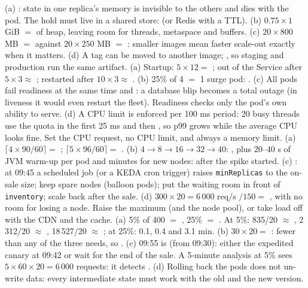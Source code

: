  (a) : state in one replica's memory is invisible to the others and dies with the pod. The hold must live in a shared store:  (or Redis with a TTL). (b) $0.75 \times 1$ GiB $=$  of heap, leaving room for threads, metaspace and buffers. (c) $20 \times 800$ MB $=$  against $20 \times 250$ MB $=$ : smaller images mean faster scale-out exactly when it matters. (d) A tag can be moved to another image; , so staging and production run the same artifact.
 (a) Startup: $5 \times 12 =$ ; out of the Service after $5 \times 3 \approx$ ; restarted after $10 \times 3 \approx$ . (b) 25\% of 4 $=$ 1 surge pod: . (c) All pods fail readiness at the same time and : a database blip becomes a total outage (in liveness it would even restart the fleet). Readiness checks only the pod's own ability to serve. (d) A CPU limit is enforced per 100 ms period: 20 busy threads use the quota in the first 25 ms and then , so p99 grows while the average CPU looks fine. Set the CPU request, no CPU limit, and always a memory limit.
 (a) $\lceil 4 \times 90/60 \rceil =$ ; $\lceil 5 \times 96/60 \rceil =$ . (b) $4 \to 8 \to 16 \to 32 \to 40$: , plus 20--40 s of JVM warm-up per pod and minutes for new nodes:  after the spike started. (c) : at 09:45 a scheduled job (or a KEDA cron trigger) raises \texttt{minReplicas} to the on-sale size; keep spare nodes (balloon pods); put the waiting room in front of \texttt{inventory}; scale back after the sale. (d) $300 \times 20 = 6\,000$ req/s $/ 150 =$ , with no room for losing a node. Raise the maximum (and the node pool), or take load off with the CDN and the cache.
 (a) 5\% of 400 $=$ , 25\% $=$ . At 5\%: 835/20 $\approx$ , 2\,312/20 $\approx$ , 18\,527/20 $\approx$ ; at 25\%: 0.1, 0.4 and 3.1 min. (b) $30 \times 20 =$ : fewer than any of the three needs, so . (c) 09:55 is  (from 09:30): either the expedited canary at 09:42 or wait for the end of the sale. A 5-minute analysis at 5\% sees $5 \times 60 \times 20 = 6\,000$ requests: it detects . (d)  Rolling back the pods does not un-write data: every intermediate state must work with the old and the new version.
